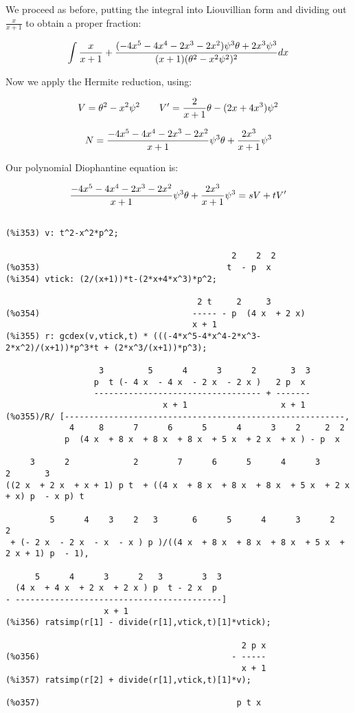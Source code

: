 We proceed as before, putting the integral into Liouvillian form
and dividing out $\frac{x}{x+1}$ to obtain a proper fraction:

$$\int {x\over{x+1}} + {{(-4x^5-4x^4-2x^3-2x^2)\psi^3\theta + {2x^3}\psi^3}\over{(x+1)(\theta^2 - x^2\psi^2)^2}} dx$$

Now we apply the Hermite reduction, using:

$$V = \theta^2 - x^2\psi^2 \qquad V' = {2\over{x+1}}\theta - (2x+4x^3)\psi^2$$

$$N = {{{-4x^5-4x^4-2x^3-2x^2}\over{x+1}}\psi^3\theta + {{2x^3}\over{x+1}}\psi^3} $$

\vfill\eject

Our polynomial Diophantine equation is:

$${{{-4x^5-4x^4-2x^3-2x^2}\over{x+1}}\psi^3\theta + {{2x^3}\over{x+1}}\psi^3}
  = sV + tV'$$

{\small\begin{verbatim}

(%i353) v: t^2-x^2*p^2;

                                              2    2  2
(%o353)                                      t  - p  x
(%i354) vtick: (2/(x+1))*t-(2*x+4*x^3)*p^2;

                                       2 t     2     3
(%o354)                               ----- - p  (4 x  + 2 x)
                                      x + 1
(%i355) r: gcdex(v,vtick,t) * (((-4*x^5-4*x^4-2*x^3-2*x^2)/(x+1))*p^3*t + (2*x^3/(x+1))*p^3);

                   3         5      4      3      2       3  3
                  p  t (- 4 x  - 4 x  - 2 x  - 2 x )   2 p  x
                  ---------------------------------- + -------
                                x + 1                   x + 1
(%o355)/R/ [---------------------------------------------------------,
             4     8      7      6      5      4      3    2     2  2
            p  (4 x  + 8 x  + 8 x  + 8 x  + 5 x  + 2 x  + x ) - p  x

     3      2             2        7      6      5      4      3      2       3
((2 x  + 2 x  + x + 1) p t  + ((4 x  + 8 x  + 8 x  + 8 x  + 5 x  + 2 x  + x) p  - x p) t

         5      4    3    2   3       6      5      4      3      2             2
 + (- 2 x  - 2 x  - x  - x ) p )/((4 x  + 8 x  + 8 x  + 8 x  + 5 x  + 2 x + 1) p  - 1),

      5      4      3      2   3        3  3
  (4 x  + 4 x  + 2 x  + 2 x ) p  t - 2 x  p
- ------------------------------------------]
                    x + 1
(%i356) ratsimp(r[1] - divide(r[1],vtick,t)[1]*vtick);

                                                2 p x
(%o356)                                       - -----
                                                x + 1
(%i357) ratsimp(r[2] + divide(r[1],vtick,t)[1]*v);

(%o357)                                        p t x

\end{verbatim}}


